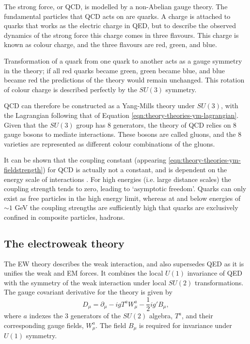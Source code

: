 The strong force, or \ac{QCD}, is modelled by a non-Abelian gauge theory. The
fundamental particles that \ac{QCD} acts on are quarks.
A charge is attached to quarks that works as the electric charge in \ac{QED},
but to describe the observed dynamics of the strong force this charge comes in
three flavours. This charge is known as colour charge, and the three flavours
are red, green, and blue.

Transformation of a quark from one quark to another acts as a gauge symmetry in
the theory; if all red quarks became green, green became blue, and blue became
red the predictions of the theory would remain unchanged. This rotation of
colour charge is described perfectly by the $SU(3)$ symmetry.

\ac{QCD} can therefore be constructed as a Yang-Mills theory under $SU(3)$,
with the Lagrangian following that of Equation
\ref{eqn:theory-theories-ym-lagrangian}. Given that the $SU(3)$ group has 8
generators, the theory of \ac{QCD} relies on 8 gauge bosons to mediate
interactions. These bosons are called gluons, and the 8 varieties are
represented as different colour combinations of the gluons.

It can be shown that the coupling constant (appearing
\ref{eqn:theory-theories-ym-fieldstrength}) for \ac{QCD} is actually not a
constant, and is dependent on the energy scale of interactions \cite{PDG2022}.
For high energies (i.e. large distance scales) the coupling strength tends to
zero, leading to `asymptotic freedom'. Quarks can only exist as free particles
in the high energy limit, whereas at and below energies of $\sim1$ GeV the
coupling strengths are sufficiently high that quarks are exclusively confined in
composite particles, hadrons.


\subsection{The electroweak theory}

The \ac{EW} theory describes the weak interaction, and also supersedes \ac{QED}
as it is unifies the weak and \ac{EM} forces.  It combines the local $U(1)$
invariance of \ac{QED} with the symmetry of the weak interaction under local
$SU(2)$ transformations. The gauge covariant derivative for the theory is given
by
%
\begin{equation*}
  D_\mu = \partial_\mu - igT^a W^a_\mu - \frac12 ig'B_\mu,
\end{equation*}
where $a$ indexes the 3 generators of the $SU(2)$ algebra, $T^a$, and their
corresponding gauge fields, $W^a_\mu$. The field $B_\mu$ is required for
invariance under $U(1)$ symmetry.

